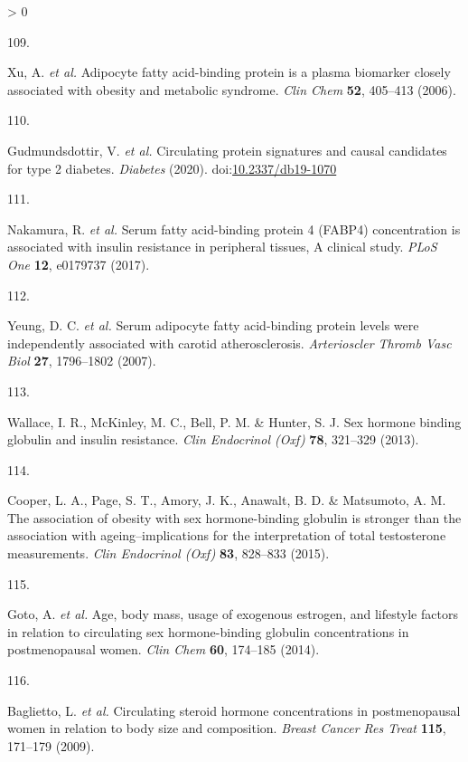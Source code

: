 \documentclass[11pt,twoside]{bristolthesis}
\newlength{\cslhangindent}
\newlength{\csllabelwidth}
\newenvironment{CSLReferences}[2] %
 {%
  \setlength{\parindent}{0pt}
  \ifodd #1 \everypar{\setlength{\hangindent}{\cslhangindent}}\ignorespaces\fi
  \ifnum #2 > 0
  \setlength{\parskip}{#2\baselineskip}
  \fi
 }%
 {}
\newcommand{\CSLLeftMargin}[1]{\parbox[t]{\csllabelwidth}{#1}}
\newcommand{\CSLRightInline}[1]{\parbox[t]{\linewidth - \csllabelwidth}{#1}\break}
\begin{document}
\begin{CSLReferences}{0}{0}
\leavevmode\hypertarget{ref-Xu2006}{}%
\CSLLeftMargin{109. }
\CSLRightInline{Xu, A. \emph{et al.} {Adipocyte fatty acid-binding protein is a plasma biomarker closely associated with obesity and metabolic syndrome}. \emph{Clin Chem} \textbf{52}, 405--413 (2006).}

\leavevmode\hypertarget{ref-Gudmundsdottir2020}{}%
\CSLLeftMargin{110. }
\CSLRightInline{Gudmundsdottir, V. \emph{et al.} {Circulating protein signatures and causal candidates for type 2 diabetes}. \emph{Diabetes} (2020). doi:\href{https://doi.org/10.2337/db19-1070}{10.2337/db19-1070}}

\leavevmode\hypertarget{ref-Nakamura2017}{}%
\CSLLeftMargin{111. }
\CSLRightInline{Nakamura, R. \emph{et al.} {Serum fatty acid-binding protein 4 (FABP4) concentration is associated with insulin resistance in peripheral tissues, A clinical study}. \emph{PLoS One} \textbf{12}, e0179737 (2017).}

\leavevmode\hypertarget{ref-Yeung2007}{}%
\CSLLeftMargin{112. }
\CSLRightInline{Yeung, D. C. \emph{et al.} {Serum adipocyte fatty acid-binding protein levels were independently associated with carotid atherosclerosis}. \emph{Arterioscler Thromb Vasc Biol} \textbf{27}, 1796--1802 (2007).}

\leavevmode\hypertarget{ref-Wallace2013}{}%
\CSLLeftMargin{113. }
\CSLRightInline{Wallace, I. R., McKinley, M. C., Bell, P. M. \& Hunter, S. J. {Sex hormone binding globulin and insulin resistance}. \emph{Clin Endocrinol (Oxf)} \textbf{78}, 321--329 (2013).}

\leavevmode\hypertarget{ref-Cooper2015}{}%
\CSLLeftMargin{114. }
\CSLRightInline{Cooper, L. A., Page, S. T., Amory, J. K., Anawalt, B. D. \& Matsumoto, A. M. {The association of obesity with sex hormone-binding globulin is stronger than the association with ageing--implications for the interpretation of total testosterone measurements}. \emph{Clin Endocrinol (Oxf)} \textbf{83}, 828--833 (2015).}

\leavevmode\hypertarget{ref-Goto2014}{}%
\CSLLeftMargin{115. }
\CSLRightInline{Goto, A. \emph{et al.} {Age, body mass, usage of exogenous estrogen, and lifestyle factors in relation to circulating sex hormone-binding globulin concentrations in postmenopausal women}. \emph{Clin Chem} \textbf{60}, 174--185 (2014).}

\leavevmode\hypertarget{ref-Baglietto2009}{}%
\CSLLeftMargin{116. }
\CSLRightInline{Baglietto, L. \emph{et al.} {Circulating steroid hormone concentrations in postmenopausal women in relation to body size and composition}. \emph{Breast Cancer Res Treat} \textbf{115}, 171--179 (2009).}


\end{CSLReferences}
\end{document}

